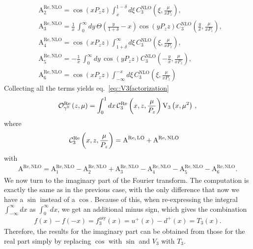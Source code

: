 \begin{align}
	& \text{A}^{\text{Re},\,\text{NLO}}_2 = \cos(x P_z z)\int_{x}^{1-\delta}d\xi \,
		C_3^{\text{NLO}}\left(\xi,\frac{\mu}{xP_z}\right), \\
	& \text{A}^{\text{Re},\,\text{NLO}}_3 = \frac{1}{x}\,\int_{0}^{\infty} dy\,
		\Theta\left(\frac{y}{1+\delta}-x\right) \cos\left(y P_z z\right)C_3^{\text{NLO}}\left(\frac{y}{x},\frac{\mu}{x P_z}\right), \\
	& \text{A}^{\text{Re},\,\text{NLO}}_4 = \cos(x P_z z)\int_{1+\delta}^{\infty}d\xi\,
		C_3^{\text{NLO}}\left(\xi,\frac{\mu}{xP_z}\right), \\
	& \text{A}^{\text{Re},\,\text{NLO}}_5 = -\frac{1}{x}\,\int_{0}^{\infty} dy\,
		\cos\left(y P_z z\right) 
		C_3^{\text{NLO}}\left(-\frac{y}{x},\frac{\mu}{x P_z}\right), \\
	& \text{A}^{\text{Re},\,\text{NLO}}_6 = \cos(x P_z z) \int_{-\infty}^{-x}d\xi \,
		C_3^{\text{NLO}}\left(\xi,\frac{\mu}{xP_z}\right)
\end{align}
Collecting all the terms yields eq.~\eqref{eq::V3factorization}
\begin{align}
	\mathcal{O}_{\gamma^0}^{\text{Re}}\left( z,\mu \right) = \int_{0}^{1} dx \, \mathcal{C}_3^{\text{Re}}\left( x, z, \frac{\mu}{P_z}\right) 
	\mathrm{V}_3\left(x,\mu^2\right)\, , 
\end{align}
where
\begin{align}
	\mathcal{C}_3^{\text{Re}}&\left( x, z, \frac{\mu}{P_z}  \right) = 
	\text{A}^{\text{Re},\,\text{LO}} + \text{A}^{\text{Re},\,\text{NLO}}  
\end{align}
with
\begin{align}
	\text{A}^{\text{Re},\,\text{NLO}}= 
	\text{A}^{\text{Re}, \,\text{NLO}}_1 - \text{A}^{\text{Re}, \,\text{NLO}}_2 + \text{A}^{\text{Re}, \,\text{NLO}}_3 
	- \text{A}^{\text{Re}, \,\text{NLO}}_4 - \text{A}^{\text{Re}, \,\text{NLO}}_5 - \text{A}^{\text{Re}, \,\text{NLO}}_6. 
\end{align}
%
We now turn to the imaginary part of the Fourier transform. The computation is
exactly the same as in the previous case, with the only difference that now we
have a $\sin$ instead of a $\cos$. Because of this, when re-expressing the
integral $\int_{-\infty}^{\infty} dx$ as $\int_{0	}^{\infty} dx $, we get an
additional minus sign, which gives the combination
\begin{align} 
	f\left(x\right)-f\left(-x\right) = f_3^{\text{asy}}\left(x\right) = u^+\left(x\right) - d^+\left(x\right) = T_3\left(x\right). 
\end{align} 
Therefore, the results for the imaginary part can be obtained from those for the real part simply by replacing $\cos$ with $\sin$ and $V_3$ with $T_3$.